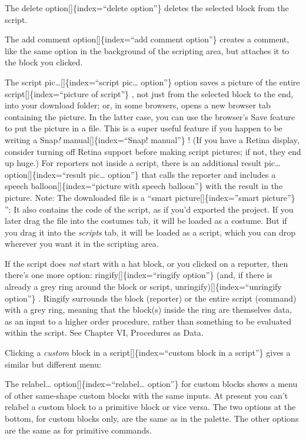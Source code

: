\documentclass[
  letterpaper,
]{book}
\begin{document}
The delete option{[}{]}\{index=``delete option''\} deletes the selected
block from the script.

The add comment option{[}{]}\{index=``add comment option''\} creates a
comment, like the same option in the background of the scripting area,
but attaches it to the block you clicked.

The script pic\ldots{[}{]}\{index=``script pic\ldots{} option''\} option
saves a picture of the entire script{[}{]}\{index=``picture of
script''\} , not just from the selected block to the end, into your
download folder; or, in some browsers, opens a new browser tab
containing the picture. In the latter case, you can use the browser's
Save feature to put the picture in a file. This is a super useful
feature if you happen to be writing a Snap\emph{!}
manual{[}{]}\{index=``Snap! manual''\} ! (If you have a Retina display,
consider turning off Retina support before making script pictures; if
not, they end up huge.) For reporters not inside a script, there is an
additional result pic\ldots{} option{[}{]}\{index=``result pic\ldots{}
option''\} that calls the reporter and includes a speech
balloon{[}{]}\{index=``picture with speech balloon''\} with the result
in the picture. Note: The downloaded file is a ``smart
picture{[}{]}\{index=''smart picture''\} '': It also contains the code
of the script, as if you'd exported the project. If you later drag the
file into the costumes tab, it will be loaded as a costume. But if you
drag it into the \emph{scripts} tab, it will be loaded as a script,
which you can drop wherever you want it in the scripting area.

If the script does \emph{not} start with a hat block, or you clicked on
a reporter, then there's one more option: ringify{[}{]}\{index=``ringify
option''\} (and, if there is already a grey ring around the block or
script, unringify){[}{]}\{index=``unringify option''\} . Ringify
surrounds the block (reporter) or the entire script (command) with a
grey ring, meaning that the block(s) inside the ring are themselves
data, as an input to a higher order procedure, rather than something to
be evaluated within the script. See Chapter VI, Procedures as Data.

Clicking a \emph{custom} block in a script{[}{]}\{index=``custom block
in a script''\} gives a similar but different menu:

The relabel\ldots{} option{[}{]}\{index=``relabel\ldots{} option''\} for
custom blocks shows a menu of other same-shape custom blocks with the
same inputs. At present you can't relabel a custom block to a primitive
block or vice versa. The two options at the bottom, for custom blocks
only, are the same as in the palette. The other options are the same as
for primitive commands.
\end{document}
